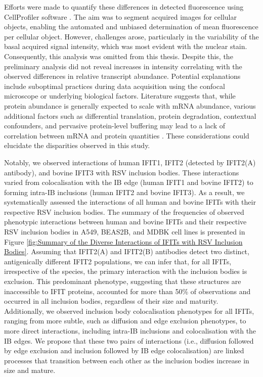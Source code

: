 Efforts were made to quantify these differences in detected fluorescence using CellProfiler software \cite{McQuin2018CellProfilerBiology}. The aim was to segment acquired images for cellular objects, enabling the automated and unbiased determination of mean fluorescence per cellular object. However, challenges arose, particularly in the variability of the basal acquired signal intensity, which was most evident with the nuclear stain. Consequently, this analysis was omitted from this thesis. Despite this, the preliminary analysis did not reveal increases in intensity correlating with the observed differences in relative transcript abundance. Potential explanations include suboptimal practices during data acquisition using the confocal microscope or underlying biological factors. Literature suggests that, while protein abundance is generally expected to scale with mRNA abundance, various additional factors such as differential translation, protein degradation, contextual confounders, and pervasive protein-level buffering may lead to a lack of correlation between mRNA and protein quantities \cite{Liu2016OnAbundance, Buccitelli2020MRNAsControl}. These considerations could elucidate the disparities observed in this study.

Notably, we observed interactions of human IFIT1, IFIT2 (detected by IFIT2(A) antibody), and bovine IFIT3 with RSV inclusion bodies. These interactions varied from colocalisation with the IB edge (human IFIT1 and bovine IFIT2) to forming intra-IB inclusions (human IFIT2 and bovine IFIT3). As a result, we systematically assessed the interactions of all human and bovine IFITs with their respective RSV inclusion bodies. The summary of the frequencies of observed phenotypic interactions between human and bovine IFITs and their respective RSV inclusion bodies in A549, BEAS2B, and MDBK cell lines is presented in Figure \ref{fig:Summary of the Diverse Interactions of IFITs with RSV Inclusion Bodies}. Assuming that IFIT2(A) and IFIT2(B) antibodies detect two distinct, antigenically different IFIT2 populations, we can infer that, for all IFITs, irrespective of the species, the primary interaction with the inclusion bodies is exclusion. This predominant phenotype, suggesting that these structures are inaccessible to IFIT proteins, accounted for more than 50\% of observations and occurred in all inclusion bodies, regardless of their size and maturity. Additionally, we observed inclusion body colocalisation phenotypes for all IFITs, ranging from more subtle, such as diffusion and edge exclusion phenotypes, to more direct interactions, including intra-IB inclusions and colocalisation with the IB edges. We propose that these two pairs of interactions (i.e., diffusion followed by edge exclusion and inclusion followed by IB edge colocalisation) are linked processes that transition between each other as the inclusion bodies increase in size and mature.

